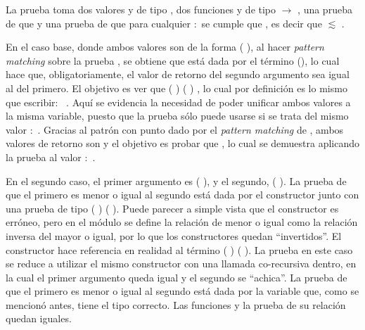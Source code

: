 \begin{AgdaAlign}
La prueba toma dos valores  y  de tipo  \AgdaDatatype{$\bot$}, dos funciones  y  de tipo  $\rightarrow$  \AgdaDatatype{$\bot$}, una prueba de que    y una prueba de que para cualquier  $:$  se cumple que   , es decir que  $\lesssim$ . 

En el caso base, donde ambos valores son de la forma ( ), al hacer \textit{pattern matching} sobre la prueba , se obtiene que está dada por el término (), lo cual hace que, obligatoriamente, el valor de retorno del segundo argumento sea igual al del primero. El objetivo es ver que  ( )    ( ) , lo cual por definición es lo mismo que escribir: \hbox{  }. Aquí se evidencia la necesidad de poder unificar ambos valores a la misma variable, puesto que la prueba  sólo puede usarse si se trata del mismo valor  $:$ . Gracias al patrón con punto dado por el \textit{pattern matching} de , ambos valores de retorno son  y el objetivo es probar que   , lo cual se demuestra aplicando la prueba  al valor  $:$ . 

En el segundo caso, el primer argumento es ( ), y el segundo, ( ). La prueba de que el primero es menor o igual al segundo está dada por el constructor  junto con una prueba  de tipo ( )  (\AgdaField{$\flat$} ). Puede parecer a simple vista que el constructor es erróneo, pero en el módulo  se define la relación de menor o igual como la relación inversa del mayor o igual, por lo que los constructores quedan ``invertidos''. El constructor  hace referencia en realidad al término ( )  ( ). La prueba en este caso se reduce a utilizar el mismo constructor con una llamada co-recursiva dentro, en la cual el primer argumento queda igual y el segundo se ``achica''. La prueba de que el primero es menor o igual al segundo está dada por la variable  que, como se mencionó antes, tiene el tipo correcto. Las funciones y la prueba de su relación quedan iguales.


\end{AgdaAlign}
